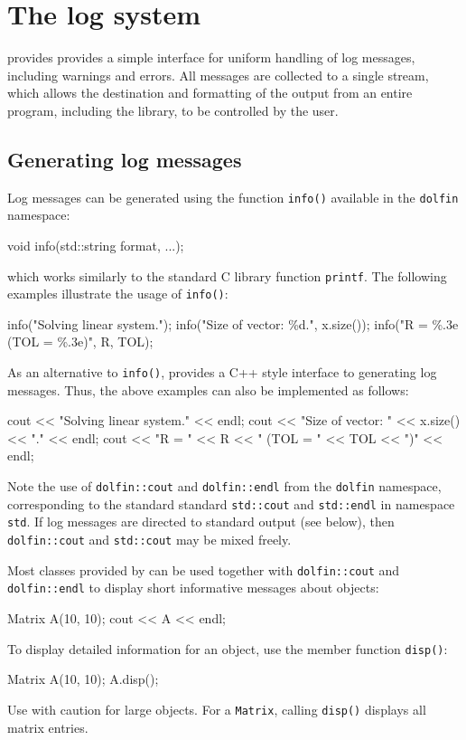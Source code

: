 \chapter{The log system}

\dolfin{} provides provides a simple interface for uniform handling of
log messages, including warnings and errors. All messages are
collected to a single stream, which allows the destination and
formatting of the output from an entire program, including the
\dolfin{} library, to be controlled by the user.

\section{Generating log messages}

Log messages can be generated using the function
\texttt{info()} available in the \texttt{dolfin} namespace:
\begin{code}
void info(std::string format, ...);
\end{code}
which works similarly to the standard C library function \texttt{printf}.
The following examples illustrate the usage of
\texttt{info()}:
\begin{code}
info("Solving linear system.");
info("Size of vector: \%d.", x.size());
info("R = \%.3e (TOL = \%.3e)", R, TOL);
\end{code}

As an alternative to \texttt{info()}, \dolfin{} provides a C++
style interface to generating log messages. Thus, the above examples
can also be implemented as follows:
\footnotesize
\begin{code}
cout << "Solving linear system." << endl;
cout << "Size of vector: " << x.size() << "." << endl;
cout << "R = " << R << " (TOL = " << TOL << ")" << endl;
\end{code}
\normalsize
Note the use of \texttt{dolfin::cout} and
\texttt{dolfin::endl} from the \texttt{dolfin} namespace,
corresponding to the standard standard \texttt{std::cout} and
\texttt{std::endl} in namespace \texttt{std}. If log messages are
directed to standard output (see below), then \texttt{dolfin::cout}
and \texttt{std::cout} may be mixed freely.

Most classes provided by \dolfin{} can be used together with
\texttt{dolfin::cout} and \texttt{dolfin::endl} to display short
informative messages about objects:
\begin{code}
Matrix A(10, 10);
cout << A << endl;
\end{code}
To display detailed information for an object,  use the member function
\texttt{disp()}:
\begin{code}
Matrix A(10, 10);
A.disp();
\end{code}
Use with caution for large objects. For a \texttt{Matrix}, calling
\texttt{disp()} displays all matrix entries.

